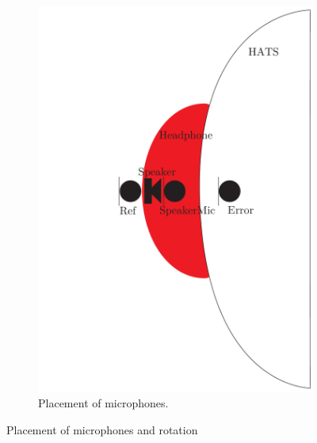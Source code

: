 \begin{figure}[H]
\begin{subfigure}[b]{.4\textwidth}
	\includegraphics[width=\textwidth]{../Journal/Experiments/AngleOfIncidence/AngleOfIncidenceSchematic.pdf}
	\caption{Placement of microphones.}
	\label{fig:AngOgIndMicplace}
\end{subfigure}
	\caption{Placement of microphones and rotation}
	\label{fig:AngleOfIndDiagram}
\end{figure}


